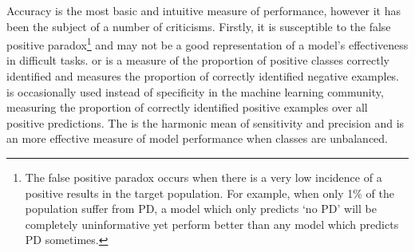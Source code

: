 \documentclass[12pt, twoside]{book}
\renewcommand\emph[1]{\textit{\color{USred}{#1}}}
\begin{document}
Accuracy is the most basic and intuitive measure of performance, however it has been the subject of a number of criticisms. Firstly, it is susceptible to the false positive paradox\footnote{The false positive paradox occurs when there is a very low incidence of a positive results in the target population. For example, when only 1\% of the population suffer from PD, a model which only predicts `no PD' will be completely uninformative yet perform better than any model which predicts PD sometimes.} and may not be a good representation of a model's effectiveness in difficult tasks. \emph{Sensitivity} or \emph{recall} is a measure of the proportion of positive classes correctly identified and \emph{specificity} measures the proportion of correctly identified negative examples. \emph{Precision} is occasionally used instead of specificity in the machine learning community, measuring the proportion of correctly identified positive examples over all positive predictions. The \emph{$F_1$ score} is the harmonic mean of sensitivity and precision and is an more effective measure of model performance when classes are unbalanced. 
\end{document}
